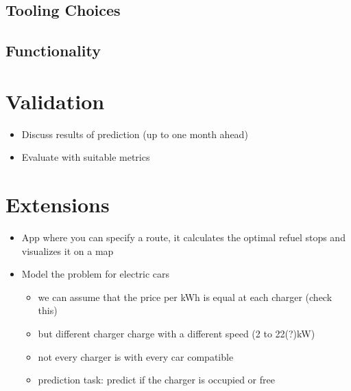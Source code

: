 \documentclass[%
a4paper,
DIV12,
2.5headlines,
bigheadings,
titlepage,
openbib,
]{scrartcl}
\begin{document}
\subsection{Tooling Choices}\label{tooling-choices}



\subsection{Functionality}\label{functionality}



\section{Validation}\label{validation}
\begin{itemize}
\item Discuss results of prediction (up to one month ahead)
\item Evaluate with suitable metrics
\end{itemize}


\section{Extensions}\label{extensions}
\begin{itemize}
\item App where you can specify a route, it calculates the optimal refuel stops and visualizes it on a map
\item Model the problem for electric cars

\begin{itemize}
\item we can assume that the price per kWh is equal at each charger (check this)\\
\item but different charger charge with a different speed (2 to 22(?)kW)\\
\item not every charger is with every car compatible\\
\item prediction task: predict if the charger is occupied or free\\
\end{itemize}
\end{itemize}


 
\end{document}
